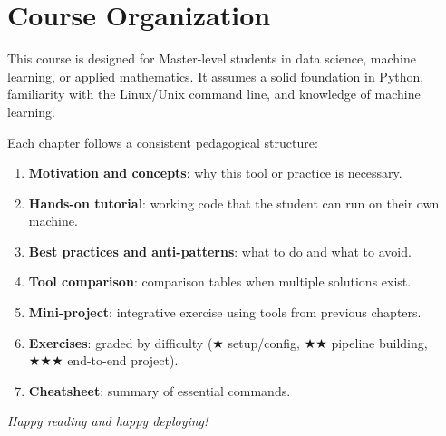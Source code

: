 \section*{Course Organization}

This course is designed for Master-level students in data science, machine
learning, or applied mathematics. It assumes a solid foundation in Python,
familiarity with the Linux/Unix command line, and knowledge of machine
learning.

Each chapter follows a consistent pedagogical structure:
\begin{enumerate}
  \item \textbf{Motivation and concepts}: why this tool or practice is
    necessary.
  \item \textbf{Hands-on tutorial}: working code that the student can run
    on their own machine.
  \item \textbf{Best practices and anti-patterns}: what to do and what to
    avoid.
  \item \textbf{Tool comparison}: comparison tables when multiple solutions
    exist.
  \item \textbf{Mini-project}: integrative exercise using tools from
    previous chapters.
  \item \textbf{Exercises}: graded by difficulty
    ($\bigstar$ setup/config, $\bigstar\bigstar$ pipeline building,
    $\bigstar\bigstar\bigstar$ end-to-end project).
  \item \textbf{Cheatsheet}: summary of essential commands.
\end{enumerate}

\vfill
\noindent\textit{Happy reading and happy deploying!}
